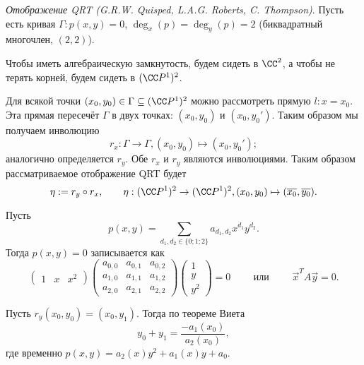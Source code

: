 \documentclass[12pt,a4paper]{article}
\begin{document}
    \begin{definition}
        \emph{Отображение QRT (G.R.W. Quisped, L.A.G. Roberts, C. Thompson)}. Пусть есть кривая $\Gamma: p(x, y) = 0$, $\deg_x(p) = \deg_y(p) = 2$ (биквадратный многочлен, $(2, 2)$).

        Чтобы иметь алгебраическую замкнутость, будем сидеть в $\CC^2$, а чтобы не терять корней, будем сидеть в $(\CC P^1)^2$.

        Для всякой точки $(x_0, y_0) \in \Gamma \subseteq (\CC P^1)^2$ можно рассмотреть прямую $l: x = x_0$. Эта прямая пересечёт $\Gamma$ в двух точках: $(x_0, y_0)$ и $(x_0, y_0')$. Таким образом мы получаем инволюцию
        \[r_x: \Gamma \to \Gamma, (x_0, y_0) \mapsto (x_0, y_0');\]
        аналогично определяется $r_y$. Обе $r_x$ и $r_y$ являются инволюциями. Таким образом рассматриваемое отображение QRT будет
        \[\eta := r_y \circ r_x, \qquad \eta: (\CC P^1)^2 \to (\CC P^1)^2, (x_0, y_0) \mapsto (\overline{x_0}, \overline{y_0}).\]
    \end{definition}

    \begin{definition}
        Пусть
        \[p(x, y) = \sum_{d_1, d_2 \in \{0; 1; 2\}} a_{d_1, d_2} x^{d_1} y^{d_2}.\]
        Тогда $p(x, y) = 0$ записывается как
        \[
            \begin{pmatrix}
                1& x& x^2
            \end{pmatrix}
            \begin{pmatrix}
                a_{0,0}& a_{0, 1}& a_{0, 2}\\
                a_{1,0}& a_{1, 1}& a_{1, 2}\\
                a_{2,0}& a_{2, 1}& a_{2, 2}
            \end{pmatrix}
            \begin{pmatrix}
                1\\
                y\\
                y^2
            \end{pmatrix}
            = 0
            \qquad \text{ или } \qquad
            \vec{x}^T A \vec{y} = 0.
        \]
    \end{definition}
    
    \begin{remark}
        Пусть $r_y(x_0, y_0) = (x_0, y_1)$. Тогда по теореме Виета
        \[y_0 + y_1 = \frac{-a_1(x_0)}{a_2(x_0)},\]
        где временно $p(x, y) = a_2(x) y^2 + a_1(x) y + a_0$.
    \end{remark}
\end{document}
